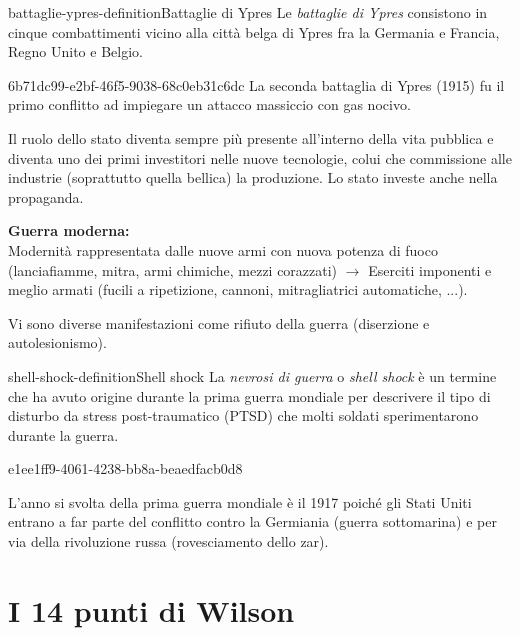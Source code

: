 \documentclass[preview]{standalone}
\begin{document}
\begin{snippetdefinition}{battaglie-ypres-definition}{Battaglie di Ypres}
    Le \textit{battaglie di Ypres} consistono in cinque
    combattimenti vicino alla città belga di Ypres fra la Germania
    e Francia, Regno Unito e Belgio.
\end{snippetdefinition}

\begin{snippet}{6b71dc99-e2bf-46f5-9038-68c0eb31c6dc}
    La seconda battaglia di Ypres (1915) fu il primo conflitto ad impiegare
    un attacco massiccio con gas nocivo.
    
    
    Il ruolo dello stato diventa sempre più presente
    all'interno della vita pubblica e diventa uno dei primi investitori
    nelle nuove tecnologie, colui che commissione alle industrie (soprattutto quella bellica)
    la produzione.
    Lo stato investe anche nella propaganda.
    
    \textbf{Guerra moderna:} \\
    Modernità rappresentata dalle nuove armi con nuova potenza di fuoco
    (lanciafiamme, mitra, armi chimiche, mezzi corazzati)
    \(\rightarrow\) Eserciti imponenti e meglio armati (fucili a ripetizione, cannoni, mitragliatrici automatiche, ...).
    
    Vi sono diverse manifestazioni come rifiuto della guerra (diserzione e autolesionismo).
\end{snippet}

\begin{snippetdefinition}{shell-shock-definition}{Shell shock}
    La \textit{nevrosi di guerra} o \textit{shell shock}
    è un termine che ha avuto origine durante la prima
    guerra mondiale per descrivere il tipo di disturbo da stress
    post-traumatico (PTSD) che molti soldati sperimentarono durante la guerra.
\end{snippetdefinition}

\begin{snippet}{e1ee1ff9-4061-4238-bb8a-beaedfacb0d8}

    L'anno si svolta della prima guerra mondiale è il 1917 poiché
    gli Stati Uniti entrano a far parte del conflitto contro la Germiania (guerra sottomarina)
    e per via della rivoluzione russa (rovesciamento dello zar).
\end{snippet}

\section{I 14 punti di Wilson}
\end{document}

